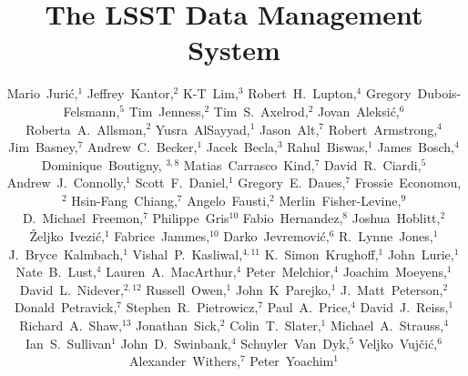 \documentclass[11pt,twoside]{article}
\begin{document}
\title{The LSST Data Management System}
\author{
Mario~Juri\'c,$^1$
Jeffrey~Kantor,$^2$
K-T~Lim,$^3$
Robert~H.~Lupton,$^4$
Gregory~Dubois-Felsmann,$^5$
Tim~Jenness,$^2$
Tim~S.~Axelrod,$^2$
Jovan~Aleksi\'c,$^6$
Roberta~A.~Allsman,$^2$
Yusra~AlSayyad,$^1$
Jason~Alt,$^7$
Robert~Armstrong,$^4$
Jim~Basney,$^7$
Andrew~C.~Becker,$^1$
Jacek~Becla,$^3$
Rahul~Biswas,$^1$
James~Bosch,$^4$
Dominique~Boutigny, $^{3,8}$
Matias~Carrasco~Kind,$^7$
David~R.~Ciardi,$^5$
Andrew~J.~Connolly,$^1$
Scott~F.~Daniel,$^1$
Gregory~E.~Daues,$^7$
Frossie~Economou,$^2$
Hsin-Fang~Chiang,$^7$
Angelo~Fausti,$^2$
Merlin~Fisher-Levine,$^9$
D.~Michael~Freemon,$^7$
Philippe~Gris$^{10}$
Fabio~Hernandez,$^8$
Joshua~Hoblitt,$^2$
\v{Z}eljko~Ivezi\'{c},$^1$
Fabrice~Jammes,$^{10}$
Darko~Jevremovi\'c,$^6$
R.~Lynne~Jones,$^1$
J.~Bryce~Kalmbach,$^1$
Vishal~P.~Kasliwal,$^{4,11}$
K.~Simon~Krughoff,$^1$
John~Lurie,$^1$
Nate~B.~Lust,$^4$
Lauren~A.~MacArthur,$^4$
Peter~Melchior,$^4$
Joachim~Moeyens,$^1$
David~L.~Nidever,$^{2,12}$
Russell~Owen,$^1$
John~K~Parejko,$^1$
J.~Matt~Peterson,$^2$
Donald~Petravick,$^7$
Stephen~R.~Pietrowicz,$^7$
Paul~A.~Price,$^4$
David~J.~Reiss,$^1$
Richard~A.~Shaw,$^{13}$
Jonathan~Sick,$^2$
Colin~T.~Slater,$^1$
Michael~A.~Strauss,$^4$
Ian~S.~Sullivan$^1$
John~D.~Swinbank,$^4$
Schuyler~Van~Dyk,$^5$
Veljko~Vuj\v ci\'c,$^6$
Alexander~Withers,$^7$
Peter~Yoachim$^1$
%
}
\end{document}
